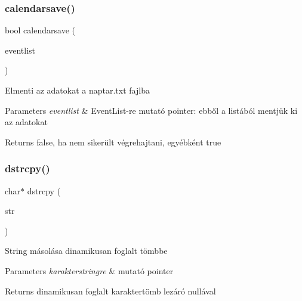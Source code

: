 \subsubsection{\texorpdfstring{calendarsave()}{calendarsave()}}
{\footnotesize\ttfamily bool calendarsave (\begin{DoxyParamCaption}\item[{\hyperlink{struct_event_list}{Event\+List} const $\ast$}]{eventlist }\end{DoxyParamCaption})}

Elmenti az adatokat a naptar.\+txt fajlba 
\begin{DoxyParams}{Parameters}
{\em eventlist} & Event\+List-\/re mutató pointer\+: ebből a listából mentjük ki az adatokat \\
\hline
\end{DoxyParams}
\begin{DoxyReturn}{Returns}
false, ha nem sikerült végrehajtani, egyébként true 
\end{DoxyReturn}
\mbox{\label{group__file_ga91b52505951ff88321e947b6e1c4b779}} 
\subsubsection{\texorpdfstring{dstrcpy()}{dstrcpy()}}
{\footnotesize\ttfamily char$\ast$ dstrcpy (\begin{DoxyParamCaption}\item[{char const $\ast$}]{str }\end{DoxyParamCaption})}

String másolása dinamikusan foglalt tömbbe 
\begin{DoxyParams}{Parameters}
{\em karakterstringre} & mutató pointer \\
\hline
\end{DoxyParams}
\begin{DoxyReturn}{Returns}
dinamikusan foglalt karaktertömb lezáró nullával 
\end{DoxyReturn}
